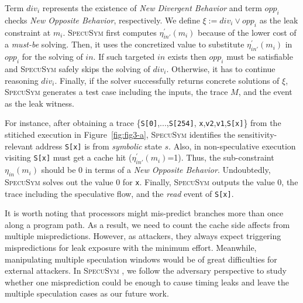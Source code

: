\documentclass[sigconf, review]{acmart}
\newcommand\ignore[1]{}
\newcommand{\SpecuSym}{\textsc{SpecuSym} }
\begin{document}
\ignore{
Note that 
speculative execution not only evicts cache lines to cause new misses but also loads 
memory data into cache that benefits new hits. Since a leak refers to the noticeable 
timing variance in program runs with and without speculative execution, from 
$\mathit{opp_i}$ the amount of new misses should differ from the amount of new hits. 
And we construct the final leak constraint $\xi$ on this observation:
}


Term $\mathit{div_i}$ represents the existence of \textit{New Divergent Behavior} 
and term $\mathit{opp_i}$ checks \textit{New Opposite Behavior}, respectively. We 
define $\xi:=\mathit{div_i}\vee\mathit{opp_i}$ as the leak constraint at $\mathit{m_i}$.
\SpecuSym first computes $\mathit{\eta_{in'}^\prime(m_i)}$ because of the lower cost 
of a \textit{must-be} solving. Then, it uses the concretized value to substitute
$\mathit{\eta_{in'}^\prime(m_i)}$ in $\mathit{opp_i}$ for the solving of $\mathit{in}$. 
If such targeted $\mathit{in}$ exists then $opp_i$ must be satisfiable and \SpecuSym
safely skips the solving of $\mathit{div_i}$. Otherwise, it has to continue reasoning 
$\mathit{div_i}$. Finally, if the solver successfully returns concrete solutions
of $\xi$, \SpecuSym generates a test case including the inputs, the trace $M$, and 
the event as the leak witness.


For instance, after obtaining a trace {\small \{\texttt{S[0]},...,\texttt{S[254]},
\texttt{x},\texttt{v2},\texttt{v1},\texttt{S[x]}\}} from the stitiched execution 
in Figure~\ref{fig:fig3-a}, \SpecuSym identifies the sensitivity-relevant address 
{\small\texttt{S[x]}} is from \textit{symbolic} state $s$. Also, in non-speculative 
execution visiting {\small\texttt{S[x]}} must get a cache hit 
($\mathit{\eta_{in'}^\prime(m_i)}$=1). Thus, the sub-constraint $\mathit{\eta_{in}(m_i)}$ 
should be 0 in terms of a \textit{New Opposite Behavior}. Undoubtedly, \SpecuSym solves 
out the value 0 for {\small\texttt{x}}. Finally, \SpecuSym outputs the value 0, the 
trace including the speculative flow, and the \textit{read} event of {\small\texttt{S[x]}}.


It is worth noting that processors might mis-predict branches more than once 
along a program path. As a result, we need to count the cache side affects 
from multiple mispredictions. However, as attackers, they always expect 
triggering mispredictions for leak exposure with the minimum effort. Meanwhile, 
manipulating multiple speculation windows would be of great difficulties for 
external attackers. In \SpecuSym, we follow the adversary perspective to study 
whether one misprediction could be enough to cause timing leaks and leave the 
multiple speculation cases as our future work. 
\end{document}
